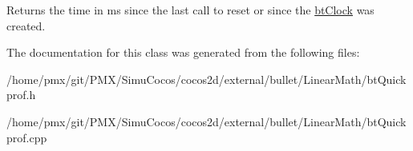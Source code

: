 Returns the time in ms since the last call to reset or since the \hyperlink{classbtClock}{bt\+Clock} was created. 

The documentation for this class was generated from the following files\+:\begin{DoxyCompactItemize}
\item 
/home/pmx/git/\+P\+M\+X/\+Simu\+Cocos/cocos2d/external/bullet/\+Linear\+Math/bt\+Quickprof.\+h\item 
/home/pmx/git/\+P\+M\+X/\+Simu\+Cocos/cocos2d/external/bullet/\+Linear\+Math/bt\+Quickprof.\+cpp\end{DoxyCompactItemize}
